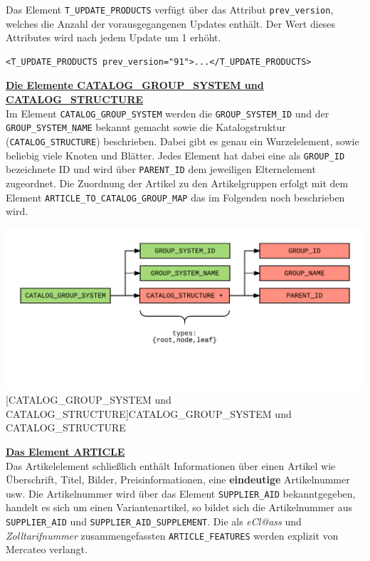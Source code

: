 	Das Element \texttt{T\_UPDATE\_PRODUCTS} verfügt über das Attribut \texttt{prev\_version}, welches die Anzahl der vorausgegangenen Updates enthält. Der Wert dieses Attributes wird nach jedem Update um 1 erhöht.
	
	\begin{lstlisting}[caption={Das Attribut \texttt{prev\_version} bei der Transaktion T\_UPDATE\_PRODUCTS}] 
	<T_UPDATE_PRODUCTS prev_version="91">...</T_UPDATE_PRODUCTS>
	\end{lstlisting}
	
	
	
	\textbf{\underline{Die Elemente CATALOG\_GROUP\_SYSTEM und CATALOG\_STRUCTURE}}\\
	
	Im Element \texttt{CATALOG\_GROUP\_SYSTEM} werden die \texttt{GROUP\_SYSTEM\_ID} und der \texttt{GROUP\_SYSTEM\_NAME} bekannt gemacht sowie die Katalogstruktur (\texttt{CATALOG\_STRUCTURE})  beschrieben. Dabei gibt es genau ein Wurzelelement, sowie beliebig viele Knoten und Blätter. Jedes Element hat dabei eine als \texttt{GROUP\_ID} bezeichnete ID und wird über \texttt{PARENT\_ID} dem jeweiligen Elternelement zugeordnet. Die Zuordnung der Artikel zu den Artikelgruppen erfolgt mit dem Element \texttt{ARTICLE\_TO\_CATALOG\_GROUP\_MAP} das im Folgenden noch beschrieben wird.
	
	\begin{minipage}{\linewidth}
		\vspace{1em}
		\centering
		\includegraphics[width=0.85\linewidth]{img/catalogGroupSystem}
		[CATALOG\_GROUP\_SYSTEM und CATALOG\_STRUCTURE]{CATALOG\_GROUP\_SYSTEM und CATALOG\_STRUCTURE}
		\label{fig:header}
		\vspace{1em}
	\end{minipage} 
	
	\textbf{\underline{Das Element ARTICLE}}\\
	Das Artikelelement schließlich enthält Informationen über einen Artikel wie Überschrift, Titel, Bilder, Preisinformationen, eine \textbf{eindeutige} Artikelnummer usw. Die Artikelnummer wird über das Element \texttt{SUPPLIER\_AID} bekanntgegeben, handelt es sich um einen Variantenartikel, so bildet sich die Artikelnummer aus \texttt{SUPPLIER\_AID} und \texttt{SUPPLIER\_AID\_SUPPLEMENT}. Die als \textit{eCl@ass} und \textit{Zolltarifnummer} zusammengefassten \texttt{ARTICLE\_FEATURES} werden explizit von Mercateo verlangt.
	
